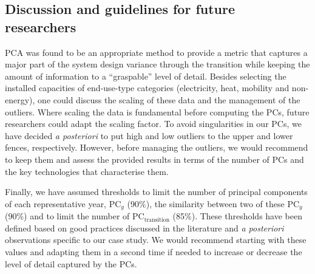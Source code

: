 \subsection{Discussion and guidelines for future researchers}
\label{subsec:meth:PCA:discussion}
\acrfull{PCA} was found to be an appropriate method to provide a metric that captures a major part of the system design variance through the transition while keeping the amount of information to a ``graspable'' level of detail. Besides selecting the installed capacities of end-use-type categories (electricity, heat, mobility and non-energy), one could discuss the scaling of these data and the management of the outliers. Where scaling the data is fundamental before computing the PCs, future researchers could adapt the scaling factor. To avoid singularities in our PCs, we have decided \textit{a posteriori} to put high and low outliers to the upper and lower fences, respectively. However, before managing the outliers, we would recommend to keep them and assess the provided results in terms of the number of PCs and the key technologies that characterise them.

Finally, we have assumed thresholds to limit the number of principal components of each representative year, $\text{PC}_y$ (90\%), the similarity between two of these $\text{PC}_y$ (90\%) and to limit the number of $\text{PC}_{\text{transition}}$ (85\%). These thresholds have been defined based on good practices discussed in the literature and \textit{a posteriori} observations specific to our case study. We would recommend starting with these values and adapting them in a second time if needed to increase or decrease the level of detail captured by the PCs.